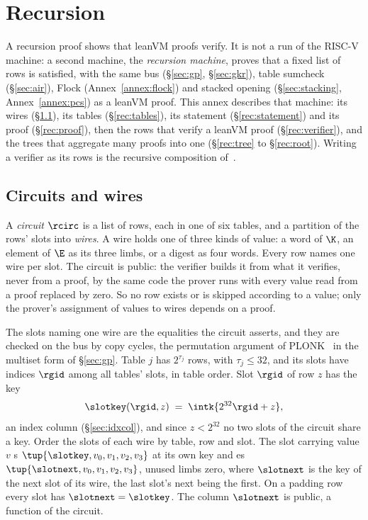 \section{Recursion}\label{annex:rec}

A recursion proof shows that leanVM proofs verify. It is not a run of the RISC-V machine: a second machine, the \emph{recursion machine}, proves that a fixed list of rows is satisfied, with the same bus (\S\ref{sec:gp}, \S\ref{sec:gkr}), table sumcheck (\S\ref{sec:air}), Flock (Annex~\ref{annex:flock}) and stacked opening (\S\ref{sec:stacking}, Annex~\ref{annex:pcs}) as a leanVM proof. This annex describes that machine: its wires (\S\ref{rec:wires}), its tables (\S\ref{rec:tables}), its statement (\S\ref{rec:statement}) and its proof (\S\ref{rec:proof}), then the rows that verify a leanVM proof (\S\ref{rec:verifier}), and the trees that aggregate many proofs into one (\S\ref{rec:tree} to \S\ref{rec:root}). Writing a verifier as its rows is the recursive composition of~\cite{BCCT13}.

\subsection{Circuits and wires}\label{rec:wires}

A \emph{circuit} $\rcirc$ is a list of rows, each in one of six tables, and a partition of the rows' slots into \emph{wires}. A wire holds one of three kinds of value: a word of $\K$, an element of $\E$ as its three limbs, or a digest as four words. Every row names one wire per slot. The circuit is public: the verifier builds it from what it verifies, never from a proof, by the same code the prover runs with every value read from a proof replaced by zero. So no row exists or is skipped according to a value; only the prover's assignment of values to wires depends on a proof.

The slots naming one wire are the equalities the circuit asserts, and they are checked on the bus by copy cycles, the permutation argument of PLONK~\cite{GWC19} in the multiset form of \S\ref{sec:gp}. Table $j$ has $2^{\tau_j}$ rows, with $\tau_j\le32$, and its slots have indices $\rgid$ among all tables' slots, in table order. Slot $\rgid$ of row $z$ has the key
\[
  \slotkey(\rgid,z)\;=\;\intk{2^{32}\rgid+z},
\]
an index column (\S\ref{sec:idxcol}), and since $z<2^{32}$ no two slots of the circuit share a key. Order the slots of each wire by table, row and slot. The slot carrying value $v$ \pull{}s $\tup{\slotkey,v_0,v_1,v_2,v_3}$ at its own key and \push{}es $\tup{\slotnext,v_0,v_1,v_2,v_3}$, unused limbs zero, where $\slotnext$ is the key of the next slot of its wire, the last slot's next being the first. On a padding row every slot has $\slotnext=\slotkey$. The column $\slotnext$ is public, a function of the circuit.


